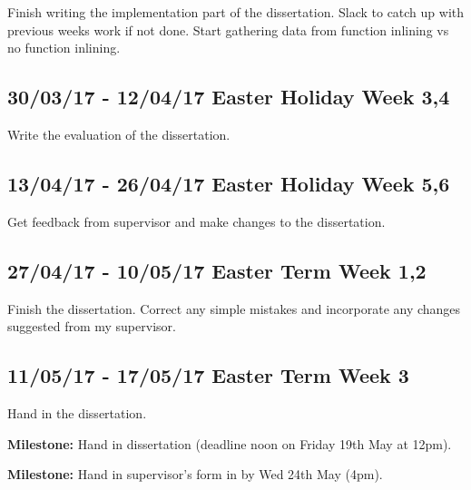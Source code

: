\documentclass[a4paper]{article}
\begin{document}
      Finish writing the implementation part of the dissertation.
      Slack to catch up with previous weeks work if not done.
      Start gathering data from function inlining vs no function inlining.


    \subsection*{30/03/17 - 12/04/17 \hfill Easter Holiday Week 3,4}

      Write the evaluation of the dissertation.


    \subsection*{13/04/17 - 26/04/17 \hfill Easter Holiday Week 5,6}

      Get feedback from supervisor and make changes to the dissertation.


    \subsection*{27/04/17 - 10/05/17 \hfill Easter Term Week 1,2}

      Finish the dissertation. Correct any simple mistakes and incorporate any changes suggested from my supervisor.


    \subsection*{11/05/17 - 17/05/17 \hfill Easter Term Week 3}
      Hand in the dissertation.

     \textbf{Milestone:} Hand in dissertation (deadline noon on Friday 19th May at 12pm).

     \textbf{Milestone:} Hand in supervisor's form in by Wed 24th May (4pm).
\end{document}
